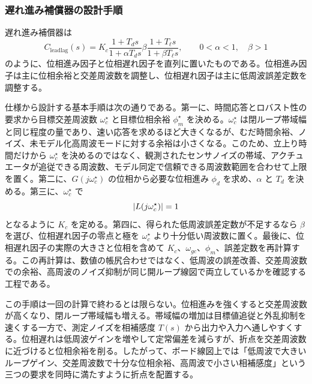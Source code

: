 \subsubsection{遅れ進み補償器の設計手順}

遅れ進み補償器は
\begin{equation}
  C_{\mathrm{leadlag}}(s)
  =K_c
  \frac{1+T_ds}{1+\alpha T_ds}
  \beta\frac{1+T_\ell s}{1+\beta T_\ell s},
  \qquad 0<\alpha<1,\quad \beta>1
\end{equation}
のように、位相進み因子と位相遅れ因子を直列に置いたものである。位相進み因子は主に位相余裕と交差周波数を調整し、位相遅れ因子は主に低周波誤差定数を調整する。

仕様から設計する基本手順は次の通りである。第一に、時間応答とロバスト性の要求から目標交差周波数 $\omega_c^\star$ と目標位相余裕 $\phi_m^\star$ を決める。$\omega_c^\star$ は閉ループ帯域幅と同じ程度の量であり、速い応答を求めるほど大きくなるが、むだ時間余裕、ノイズ、未モデル化高周波モードに対する余裕は小さくなる。このため、立上り時間だけから $\omega_c^\star$ を決めるのではなく、観測されたセンサノイズの帯域、アクチュエータが追従できる周波数、モデル同定で信頼できる周波数範囲を合わせて上限を置く。第二に、$G(j\omega_c^\star)$ の位相から必要な位相進み $\phi_d$ を求め、$\alpha$ と $T_d$ を決める。第三に、$\omega_c^\star$ で
\begin{equation}
  \left|L(j\omega_c^\star)\right|=1
\end{equation}
となるように $K_c$ を定める。第四に、得られた低周波誤差定数が不足するなら $\beta$ を選び、位相遅れ因子の零点と極を $\omega_c^\star$ より十分低い周波数に置く。最後に、位相遅れ因子の実際の大きさと位相を含めて $K_c$、$\omega_{gc}$、$\phi_m$、誤差定数を再計算する。この再計算は、数値の帳尻合わせではなく、低周波の誤差改善、交差周波数での余裕、高周波のノイズ抑制が同じ開ループ線図で両立しているかを確認する工程である。

この手順は一回の計算で終わるとは限らない。位相進みを強くすると交差周波数が高くなり、閉ループ帯域幅も増える。帯域幅の増加は目標値追従と外乱抑制を速くする一方で、測定ノイズを相補感度 $T(s)$ から出力や入力へ通しやすくする。位相遅れは低周波ゲインを増やして定常偏差を減らすが、折点を交差周波数に近づけると位相余裕を削る。したがって、ボード線図上では「低周波で大きいループゲイン、交差周波数で十分な位相余裕、高周波で小さい相補感度」という三つの要求を同時に満たすように折点を配置する。

